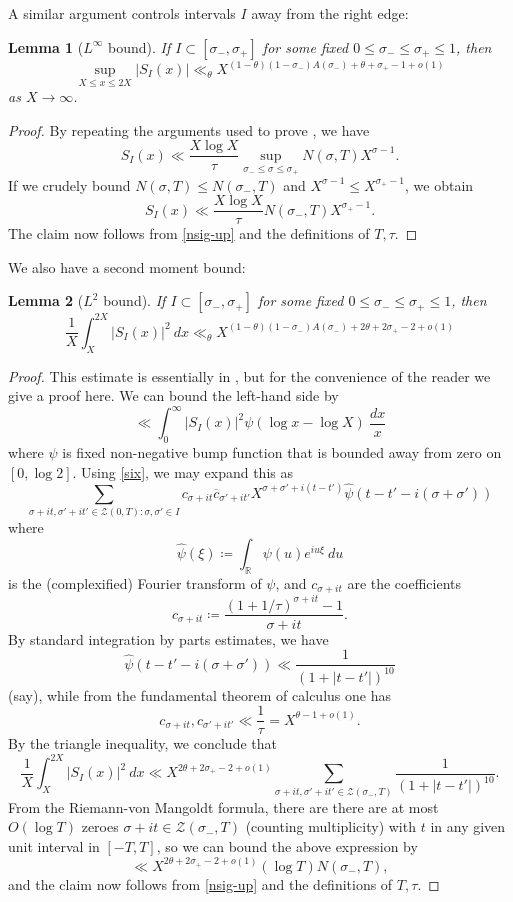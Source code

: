 \documentclass[12pt]{amsart}
\newtheorem{lemma}{Lemma}[section]
\newcommand{\R}{\mathbb{R}}
\begin{document}
A similar argument controls intervals $I$ away from the right edge:

\begin{lemma}[$L^\infty$ bound]\label{linfty-bound}  If $I \subset [\sigma_-, \sigma_+]$ for some fixed $0 \leq \sigma_- \leq \sigma_+ \leq 1$, then
$$ \sup_{X \leq x \leq 2X} |S_I(x)| \ll_\theta X^{(1-\theta)(1-\sigma_-) A(\sigma_-) + \theta + \sigma_+ - 1 + o(1)}$$
as $X \to \infty$.
\end{lemma}

\begin{proof}
By repeating the arguments used to prove , we have
$$ S_I(x) \ll \frac{X \log X}{\tau} \sup_{\sigma_- \leq \sigma \leq \sigma_+} N(\sigma,T) X^{\sigma-1}.$$
If we crudely bound $N(\sigma,T) \leq N(\sigma_-,T)$ and $X^{\sigma-1} \leq X^{\sigma_+ - 1}$, we obtain
$$ S_I(x) \ll \frac{X \log X}{\tau} N(\sigma_-,T) X^{\sigma_+ - 1}.$$
The claim now follows from \eqref{nsig-up} and the definitions of $T,\tau$.
\end{proof}

We also have a second moment bound:

\begin{lemma}[$L^2$ bound]\label{l2-bound}  If $I \subset [\sigma_-, \sigma_+]$ for some fixed $0 \leq \sigma_- \leq \sigma_+ \leq 1$, then
$$ \frac{1}{X}\int_X^{2X} |S_I(x)|^2\ dx \ll_\theta X^{(1-\theta) (1-\sigma_-) A(\sigma_-) + 2\theta + 2\sigma_+ - 2 + o(1)}$$
\end{lemma}

\begin{proof}  This estimate is essentially in \cite[\S 2]{HB-2}, but for the convenience of the reader we give a proof here.  We can bound the left-hand side by
  $$ \ll \int_0^\infty |S_I(x)|^2 \psi(\log x - \log X)\ \frac{dx}{x}$$
  where $\psi$ is fixed non-negative bump function that is bounded away from zero on $[0,\log 2]$.  Using \eqref{six}, we may expand this as
$$ \sum_{\sigma+it, \sigma'+it' \in {\mathcal Z}(0,T): \sigma,\sigma' \in I} c_{\sigma+it} \overline{c}_{\sigma'+it'} X^{\sigma+\sigma'+i(t-t')} \hat \psi( t-t' - i(\sigma+\sigma'))$$
where
$$ \hat \psi(\xi) \coloneqq \int_\R \psi(u) e^{iu\xi}\ du$$
is the (complexified) Fourier transform of $\psi$, and $c_{\sigma+it}$ are the coefficients
$$ c_{\sigma+it} \coloneqq \frac{(1+1/\tau)^{\sigma+it} - 1}{\sigma+it}.$$
By standard integration by parts estimates, we have
$$ \hat \psi( t-t' - i(\sigma+\sigma')) \ll\frac{1}{(1 + |t-t'|)^{10}}$$
(say), while from the fundamental theorem of calculus one has
$$ c_{\sigma+it}, c_{\sigma'+it'} \ll \frac{1}{\tau} = X^{\theta - 1 + o(1)}.$$
By the triangle inequality, we conclude that
$$ \frac{1}{X}\int_X^{2X} |S_I(x)|^2\ dx
\ll X^{2\theta+ 2\sigma_+-2+o(1)} \sum_{\sigma+it, \sigma'+it' \in {\mathcal Z}(\sigma_-,T)} \frac{1}{(1 + |t-t'|)^{10}}.$$
From the Riemann-von Mangoldt formula, there are there are at most $O(\log T)$ zeroes $\sigma+it \in {\mathcal Z}(\sigma_-,T)$ (counting multiplicity) with $t$ in any given unit interval in $[-T,T]$, so we can bound the above expression by
$$ \ll X^{2\theta+ 2\sigma_+-2+o(1)} (\log T) N(\sigma_-, T),$$
and the claim now follows from \eqref{nsig-up} and the definitions of $T,\tau$.
\end{proof}
\end{document}
